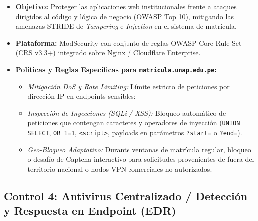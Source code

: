 \begin{itemize}
    \item \textbf{Objetivo:} Proteger las aplicaciones web institucionales frente a ataques dirigidos al código y lógica de negocio (OWASP Top 10), mitigando las amenazas STRIDE de \textit{Tampering} e \textit{Injection} en el sistema de matrícula.
    \item \textbf{Plataforma:} ModSecurity con conjunto de reglas OWASP Core Rule Set (CRS v3.3+) integrado sobre Nginx / Cloudflare Enterprise.
    \item \textbf{Políticas y Reglas Específicas para \texttt{matricula.unap.edu.pe}:}
    \begin{itemize}
        \item \textit{Mitigación DoS y Rate Limiting:} Límite estricto de peticiones por dirección IP en endpoints sensibles:
        

        \item \textit{Inspección de Inyecciones (SQLi / XSS):} Bloqueo automático de peticiones que contengan caracteres y operadores de inyección (\texttt{UNION SELECT}, \texttt{OR 1=1}, \texttt{<script>}, payloads en parámetros \texttt{?start=} o \texttt{?end=}).
        \item \textit{Geo-Bloqueo Adaptativo:} Durante ventanas de matrícula regular, bloqueo o desafío de Captcha interactivo para solicitudes provenientes de fuera del territorio nacional o nodos VPN comerciales no autorizados.
    \end{itemize}
\end{itemize}

\subsection{Control 4: Antivirus Centralizado / Detección y Respuesta en Endpoint (EDR)}

